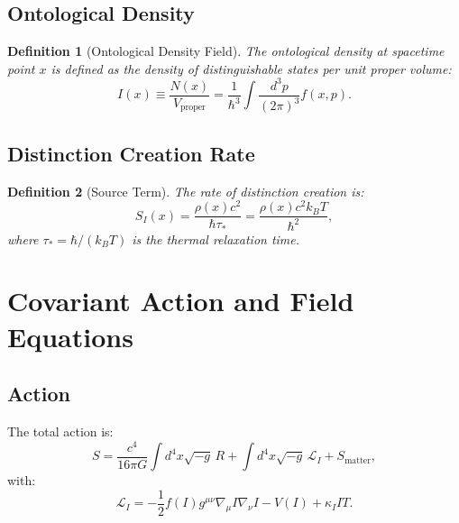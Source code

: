 \documentclass[12pt, a4paper]{article}
\newtheorem{definition}{Definition}
\begin{document}
\subsection{Ontological Density}

\begin{definition}[Ontological Density Field]
The ontological density at spacetime point $x$ is defined as the density of distinguishable states per unit proper volume:
\begin{equation}
    I(x) \equiv \frac{N(x)}{V_{\text{proper}}} = \frac{1}{\hbar^3} \int \frac{d^3p}{(2\pi)^3} f(x,p).
\end{equation}
\end{definition}

\subsection{Distinction Creation Rate}

\begin{definition}[Source Term]
The rate of distinction creation is:
\begin{equation}
    S_I(x) = \frac{\rho(x) c^2}{\hbar \tau_*} = \frac{\rho(x) c^2 k_B T}{\hbar^2},
\end{equation}
where $\tau_* = \hbar/(k_B T)$ is the thermal relaxation time.
\end{definition}


\section{Covariant Action and Field Equations}

\subsection{Action}

The total action is:
\begin{equation}
    S = \frac{c^4}{16\pi G} \int d^4x \sqrt{-g} \, R + \int d^4x \sqrt{-g} \, \mathcal{L}_I + S_{\text{matter}},
\end{equation}
with:
\begin{equation}
    \mathcal{L}_I = -\frac{1}{2} f(I) g^{\mu\nu} \nabla_\mu I \nabla_\nu I - V(I) + \kappa_I I T.
\end{equation}
\end{document}
